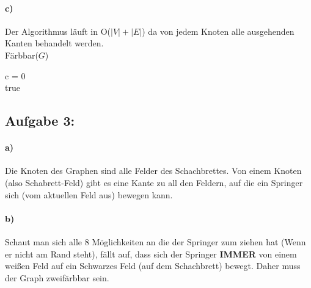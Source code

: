 \documentclass[a4paper]{article}
\begin{document}
\paragraph{c)}
Der Algorithmus läuft in O($|V| + |E|$) da von jedem Knoten alle ausgehenden 
Kanten behandelt werden. \\
\noindent Färbbar($G$)\\
\begin{algorithm}[H]
	c = 0 \\
	\Return true \\
\end{algorithm}

\subsection*{Aufgabe 3:}

\paragraph{a)}
Die Knoten des Graphen sind alle Felder des Schachbrettes.
Von einem Knoten (also Schabrett-Feld) gibt es eine Kante zu all den Feldern, 
auf die ein Springer sich (vom aktuellen Feld aus) bewegen kann.

\paragraph{b)}
Schaut man sich alle 8 Möglichkeiten an die der Springer zum ziehen hat
(Wenn er nicht am Rand steht), fällt auf, dass sich der Springer 
\textbf{IMMER} von einem weißen Feld auf ein Schwarzes Feld (auf
dem Schachbrett) bewegt. Daher muss der Graph zweifärbbar sein.
\end{document}
